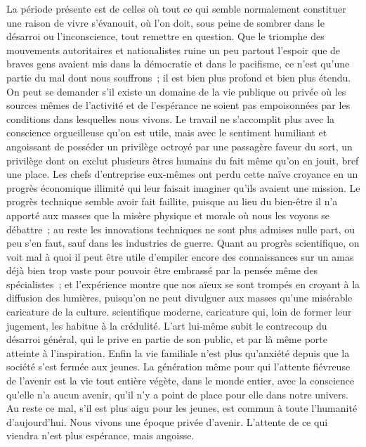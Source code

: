 \documentclass[french,twoside]{book} %
\begin{document}
\noindent \par
La période présente est de celles où tout ce qui semble normalement constituer une raison de vivre s'évanouit, où l'on doit, sous peine de sombrer dans le désarroi ou l'inconscience, tout remettre en question. Que le triomphe des mouvements autoritaires et nationalistes ruine un peu partout l'espoir que de braves gens avaient mis dans la démocratie et dans le pacifisme, ce n'est qu'une partie du mal dont nous souffrons ; il est bien plus profond et bien plus étendu. On peut se demander s'il existe un domaine de la vie publique ou privée où les sources mêmes de l'activité et de l'espérance ne soient pas empoisonnées par les conditions dans lesquelles nous vivons. Le travail ne s'accomplit plus avec la conscience orgueilleuse qu'on est utile, mais avec le sentiment humiliant et angoissant de posséder un privilège octroyé par une passagère faveur du sort, un privilège dont on exclut plusieurs êtres humains du fait même qu'on en jouit, bref une place. Les chefs d'entreprise eux-mêmes ont perdu cette naïve croyance en un progrès économique illimité qui leur faisait imaginer qu'ils avaient une mission. Le progrès technique semble avoir fait faillite, puisque au lieu du bien-être il n'a apporté aux masses que la misère physique et morale où nous les voyons se débattre ; au reste les innovations techniques ne sont plus admises nulle part, ou peu s'en faut, sauf dans les industries de guerre. Quant au progrès scientifique, on voit mal à quoi il peut être utile d'empiler encore des connaissances sur un amas déjà bien trop vaste pour pouvoir être embrassé par la pensée même des spécialistes ; et l'expérience montre que nos aïeux se sont trompés en croyant à la diffusion des lumières, puisqu'on ne peut divulguer aux masses qu'une misérable caricature de la culture. scientifique moderne, caricature qui, loin de former leur jugement, les habitue à la crédulité. L'art lui-même subit le contrecoup du désarroi général, qui le prive en partie de son public, et par là même porte atteinte à l'inspiration. Enfin la vie familiale n'est plus qu'anxiété depuis que la société s'est fermée aux jeunes. La génération même pour qui l'attente fiévreuse de l'avenir est la vie tout entière végète, dans le monde entier, avec la conscience qu'elle n'a aucun avenir, qu'il n'y a point de place pour elle dans notre univers. Au reste ce mal, s'il est plus aigu pour les jeunes, est commun à toute l'humanité d'aujourd'hui. Nous vivons une époque privée d'avenir. L'attente de ce qui viendra n'est plus espérance, mais angoisse.\par
\end{document}
